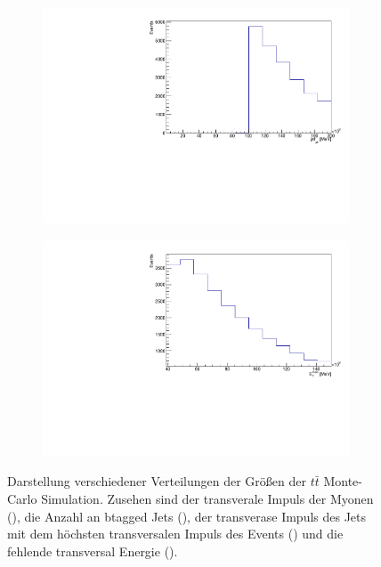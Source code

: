 \begin{figure}
\begin{subfigure}{0.5\textwidth}
    \includegraphics[width=\linewidth]{plots_and_txt/ttbar.mu_selected_/ttbar.mu_selected_jet_pt.pdf}
    \caption{}
    \label{fig:jet_pt_good}
  \end{subfigure}%
  \begin{subfigure}{0.5\textwidth}
    \centering
    \includegraphics[width=\linewidth]{plots_and_txt/ttbar.mu_selected_/ttbar.mu_selected_met_et.pdf}
    \caption{}
    \label{fig:met_et}
  \end{subfigure}%
  \caption{Darstellung verschiedener Verteilungen der Größen der $t\bar{t}$ Monte-Carlo Simulation.
  Zusehen sind der transverale Impuls der Myonen (), die Anzahl an btagged Jets (), der transverase Impuls des Jets mit dem höchsten transversalen Impuls des Events () und die fehlende transversal Energie ().
  }
  \label{fig:Distributions}
\end{figure}

